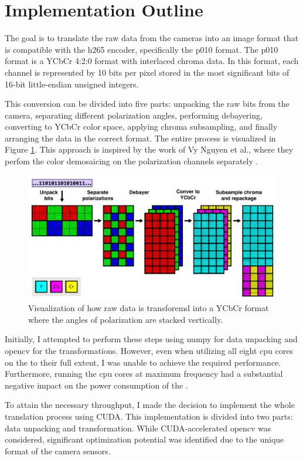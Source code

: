 \section{Implementation Outline}
The goal is to translate the raw data from the cameras into an image format that is compatible with the \gls{h265} encoder, specifically the \gls{p010} format.
The \gls{p010} format is a YCbCr 4:2:0 format with interlaced chroma data.
In this format, each channel is represented by 10 bits per pixel stored in the most significant bits of 16-bit little-endian unsigned integers.

This conversion can be divided into five parts: unpacking the raw bits from the camera, separating different polarization angles, performing debayering, converting to YCbCr color space, applying chroma subsampling, and finally arranging the data in the correct format.
The entire process is visualized in Figure \ref{fig:transform}.
This approach is inspired by the work of Vy Nguyen et al., where they perfom the color demosaicing on the polarization channels separately \cite{nguyenTwoStepColorPolarizationDemosaicking2022}.


\begin{figure}[H]
    \centering
    \includegraphics[width=\textwidth]{figures/polarized_image/transform.pdf}
    \caption{Visualization of how raw data is transforemd into a YCbCr format where the angles of polarization are stacked vertically.}
    \label{fig:transform}
\end{figure}


Initially, I attempted to perform these steps using \gls{numpy} for data unpacking and \gls{opencv} for the transformations.
However, even when utilizing all eight \gls{cpu} cores on the \jx to their full extent, I was unable to achieve the required performance.
Furthermore, running the \gls{cpu} cores at maximum frequency had a substantial negative impact on the power consumption of the \jx.

To attain the necessary throughput, I made the decision to implement the whole translation process using CUDA.
This implementation is divided into two parts: data unpacking and transformation.
While CUDA-accelerated \gls{opencv} was considered, significant optimization potential was identified due to the unique format of the camera sensors.
